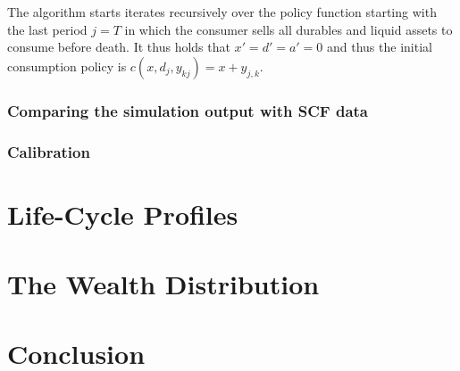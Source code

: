 \documentclass[a4paper,12pt]{article}
\begin{document}
The algorithm starts iterates recursively over the policy function starting with the last period $j=T$ in which the consumer sells all durables and liquid assets to consume before death. It thus holds that $x'=d'=a'=0$ and thus the initial consumption policy is $c(x,d_{j},y_{kj})=x+y_{j,k}$.






\subsubsection{Comparing the simulation output with SCF data}

\subsubsection{Calibration}







\section{Life-Cycle Profiles}
\label{Chapter4}
\section{The Wealth Distribution}
\label{Chapter5}
\section{Conclusion}
\label{Chapter6}


\newpage





\newpage
\end{document}

